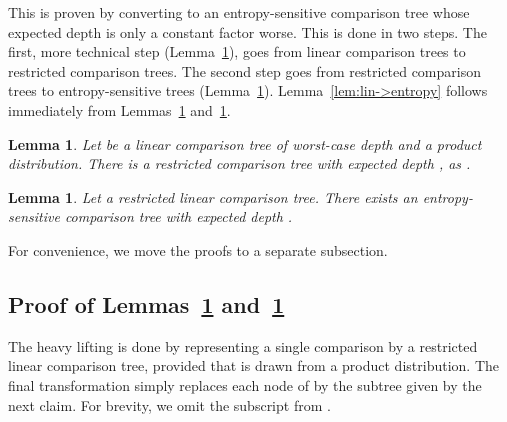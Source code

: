 \documentclass[letterpaper,11pt]{article}
\newtheorem{lemma}[theorem]{Lemma}
\begin{document}
This is proven by converting  
to an entropy-sensitive comparison 
tree whose expected depth is only 
a constant factor worse.  This is done in two steps. The first, more technical
step (Lemma~\ref{lem:lin->restricted}), goes from linear comparison trees to restricted comparison trees.
The second step goes from restricted comparison trees to entropy-sensitive trees (Lemma~\ref{lem:restricted->entropy}).
Lemma~\ref{lem:lin->entropy} follows immediately from Lemmas~\ref{lem:lin->restricted} and~\ref{lem:restricted->entropy}.

\begin{lemma}\label{lem:lin->restricted}
  Let  be a linear 
  comparison tree of worst-case
  depth  and  a product
  distribution. There is a restricted 
  comparison tree  with expected depth 
  , as 
  .
\end{lemma}

\begin{lemma}\label{lem:restricted->entropy}
  Let  a restricted linear comparison 
  tree. 
  There exists an entropy-sensitive comparison
  tree  with expected depth .
\end{lemma}


For convenience, we move the proofs to a separate subsection.

\subsection{Proof of Lemmas~\ref{lem:lin->restricted} and~\ref{lem:restricted->entropy}}
\label{sec:lin->restricted}

The heavy lifting is done by representing a single 
comparison by a restricted linear comparison 
tree, provided that  is drawn from a 
product distribution. The final transformation simply
replaces each node of  by the subtree given 
by the next claim. For brevity, we omit the 
subscript  from . 
\end{document}
